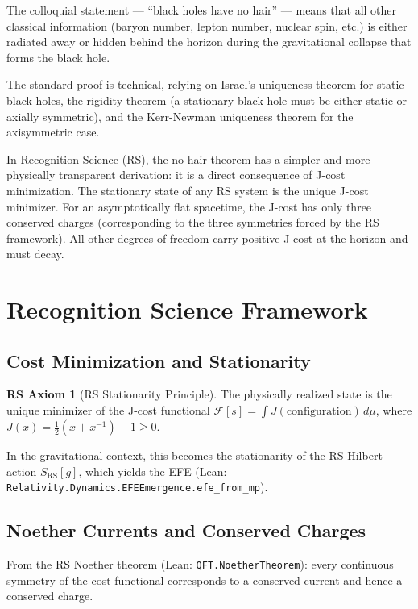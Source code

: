 \documentclass[12pt,a4paper]{article}
\theoremstyle{definition}
\newtheorem{axiom_rs}[theorem]{RS Axiom}
\theoremstyle{remark}
\begin{document}
The colloquial statement — ``black holes have no hair'' — means that all
other classical information (baryon number, lepton number, nuclear spin,
etc.) is either radiated away or hidden behind the horizon during the
gravitational collapse that forms the black hole.

The standard proof is technical, relying on Israel's uniqueness theorem
for static black holes, the rigidity theorem (a stationary black hole
must be either static or axially symmetric), and the Kerr-Newman
uniqueness theorem for the axisymmetric case.

In Recognition Science (RS), the no-hair theorem has a simpler and more
physically transparent derivation: it is a direct consequence of
J-cost minimization.  The stationary state of any RS system is the unique
J-cost minimizer.  For an asymptotically flat spacetime, the J-cost has
only three conserved charges (corresponding to the three symmetries
forced by the RS framework).  All other degrees of freedom carry
positive J-cost at the horizon and must decay.

\section{Recognition Science Framework}
\label{sec:rs}

\subsection{Cost Minimization and Stationarity}

\begin{axiom_rs}[RS Stationarity Principle]
The physically realized state is the unique minimizer of the J-cost
functional $\mathcal{F}[s] = \int J(\text{configuration}) \, d\mu$,
where $J(x) = \tfrac{1}{2}(x + x^{-1}) - 1 \geq 0$.
\end{axiom_rs}

In the gravitational context, this becomes the stationarity of the RS
Hilbert action $S_\mathrm{RS}[g]$, which yields the EFE
(Lean: \texttt{Relativity.Dynamics.EFEEmergence.efe\_from\_mp}).

\subsection{Noether Currents and Conserved Charges}

From the RS Noether theorem (Lean: \texttt{QFT.NoetherTheorem}):
every continuous symmetry of the cost functional corresponds to a
conserved current and hence a conserved charge.
\end{document}

